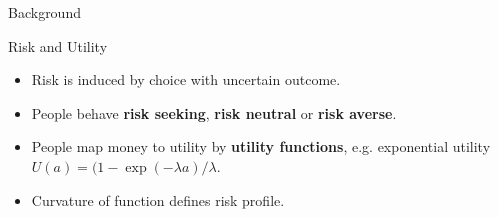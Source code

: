 \begin{exampleblock}{Background}

\Large{Risk and Utility}

\normalsize

\begin{itemize}
    \item Risk is induced by choice with uncertain outcome.
    \item People behave \textbf{risk seeking}, \textbf{risk neutral} or \textbf{risk averse}.
    \item People map money to utility by \textbf{utility functions}, e.g. exponential utility $U(a) = (1-\exp(-\lambda a) / \lambda$. 
    \item Curvature of function defines risk profile.
\end{itemize}






\end{exampleblock}
